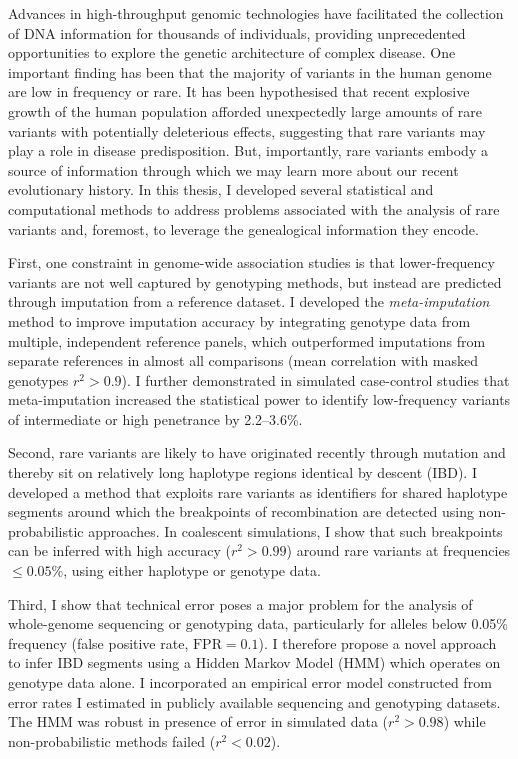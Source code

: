 




Advances in high-throughput genomic technologies have facilitated the collection of DNA information for thousands of individuals, providing unprecedented opportunities to explore the genetic architecture of complex disease.
One important finding has been that the majority of variants in the human genome are low in frequency or rare.
It has been hypothesised that recent explosive growth of the human population afforded unexpectedly large amounts of rare variants with potentially deleterious effects, suggesting that rare variants may play a role in disease predisposition.
But, importantly, rare variants embody a source of information through which we may learn more about our recent evolutionary history.
In this thesis, I developed several statistical and computational methods to address problems associated with the analysis of rare variants and, foremost, to leverage the genealogical information they encode.

First, one constraint in genome-wide association studies is that lower-frequency variants are not well captured by genotyping methods, but instead are predicted through imputation from a reference dataset.
I developed the \emph{meta-imputation} method to improve imputation accuracy by integrating genotype data from multiple, independent reference panels, which outperformed imputations from separate references in almost all comparisons (mean correlation with masked genotypes ${r^2 > 0.9}$).
I further demonstrated in simulated case-control studies that meta-imputation increased the statistical power to identify low-frequency variants of intermediate or high penetrance by 2.2--3.6\%.

Second, rare variants are likely to have originated recently through mutation and thereby sit on relatively long haplotype regions identical by descent (IBD).
I developed a method that exploits rare variants as identifiers for shared haplotype segments around which the breakpoints of recombination are detected using non-probabilistic approaches.
In coalescent simulations, I show that such breakpoints can be inferred with high accuracy (${r^2 > 0.99}$) around rare variants at frequencies ${\leq 0.05\%}$, using either haplotype or genotype data.

Third, I show that technical error poses a major problem for the analysis of whole-genome sequencing or genotyping data, particularly for alleles below 0.05\% frequency (false positive rate, ${\text{FPR}=0.1}$).
I therefore propose a novel approach to infer IBD segments using a Hidden Markov Model (HMM) which operates on genotype data alone.
I incorporated an empirical error model constructed from error rates I estimated in publicly available sequencing and genotyping datasets.
The HMM was robust in presence of error in simulated data (${r^2>0.98}$) while non-probabilistic methods failed (${r^2<0.02}$).

